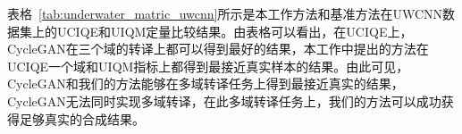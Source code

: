 表格~\ref{tab:underwater_matric_uwcnn}所示是本工作方法和基准方法在UWCNN数据集上的UCIQE和UIQM定量比较结果。由表格可以看出，在UCIQE上，CycleGAN在三个域的转译上都可以得到最好的结果，本工作中提出的方法在UCIQE一个域和UIQM指标上都得到最接近真实样本的结果。由此可见，CycleGAN和我们的方法能够在多域转译任务上得到最接近真实的结果，CycleGAN无法同时实现多域转译，在此多域转译任务上，我们的方法可以成功获得足够真实的合成结果。
